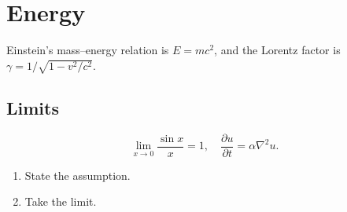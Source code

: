 \documentclass{article}
\begin{document}
\section{Energy}
Einstein's mass--energy relation is $E = mc^2$, and the Lorentz factor is $\gamma = 1/\sqrt{1 - v^2/c^2}$.

\subsection{Limits}
\[
\lim_{x \to 0} \frac{\sin x}{x} = 1, \quad \frac{\partial u}{\partial t} = \alpha \nabla^2 u.
\]

\begin{enumerate}
    \item State the assumption.
    \item Take the limit.
\end{enumerate}
\end{document}
